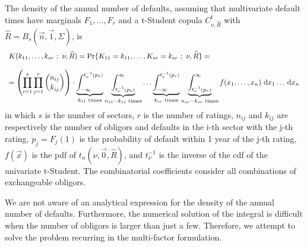\documentclass[11pt,fleqn]{book} %
\begin{document}
\begin{proposition}
	The density of the annual number of defaults, assuming that multivariate 
	default times have marginals $F_1,\dots,F_r$ and a t-Student copula 
	$C_{\nu,\widehat{R}}^{\text{t}}$ with 
	$\widehat{R} = B_s(\vec{n},\vec{1},\Sigma)$, is
	\begin{displaymath}
		\begin{array}{l}
			K(k_{11},\dots,k_{sr}\ ;\ \nu, \widehat{R}) = 
			\Pr\{K_{11}=k_{11},\dots,K_{sr}=k_{sr}\ ;\ \nu, \widehat{R}\} = \\
			\\
			= \left( \displaystyle \prod_{i=1}^s \prod_{j=1}^r \binom{n_{ij}}{k_{ij}} \right) \cdot
			\displaystyle
			\underbrace{\int_{-\infty}^{t_{\nu}^{-1}(p_1)}}_{k_{11} \text{ times}}
			\underbrace{\int_{t_{\nu}^{-1}(p_1)}^{\infty}}_{n_{11}-k_{11} \text{ times}}
			\dots
			\underbrace{\int_{-\infty}^{t_{\nu}^{-1}(p_r)}}_{k_{sr} \text{ times}}
			\underbrace{\int_{t_{\nu}^{-1}(p_r)}^{\infty}}_{n_{sr}-k_{sr} \text{ times}}
			f(x_1,\dots,x_n) \mathop{\,\mathrm{{}d}}\mathopen{} x_1 \dots \mathop{\,\mathrm{{}d}}\mathopen{} x_n
		\end{array}
	\end{displaymath}
	in which $s$ is the number of sectors, $r$ is the number of ratings,
	$n_{ij}$ and $k_{ij}$ are respectively the number of obligors and 
	defaults in the i-th sector with the j-th rating, $p_j = F_j(1)$ is the 
	probability of default within 1 year of the j-th rating, $f(\vec{x})$ 
	is the pdf of $t_n(\nu,\vec{0},\widehat{R})$, and $t_{\nu}^{-1}$ is the 
	inverse of the cdf of the univariate t-Student. The combinatorial 
	coefficients consider all combinations of exchangeable obligors.
\end{proposition}

We are not aware of an analytical expression for the density of the annual 
number of defaults. Furthermore, the numerical solution of the integral is 
difficult when the number of obligors is larger than just a few. Therefore,
we attempt to solve the problem recurring in the multi-factor formulation. 
\end{document}
